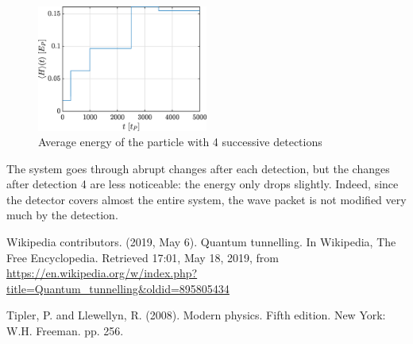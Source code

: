 \documentclass[a4paper,12pt,twoside]{article}
\begin{document}
      \begin{figure}[h!]
      \centering
       \includegraphics[width=0.5\textwidth]{graphs/bonus2_H.eps}
       \caption{Average energy of the particle with 4 successive detections}
       \label{fig:bonus2_H}
      \end{figure}
      
      The system goes through abrupt changes after each detection, but the changes after detection 4 are less noticeable: the energy only drops slightly. Indeed, since the detector covers almost the entire system, the wave packet is not modified very much by the detection.

\newpage
\begin{thebibliography}{99}
   Wikipedia contributors. (2019, May 6). Quantum tunnelling. In Wikipedia, The Free Encyclopedia. Retrieved 17:01, May 18, 2019, from \url{https://en.wikipedia.org/w/index.php?title=Quantum_tunnelling&oldid=895805434}

   Tipler, P. and Llewellyn, R. (2008). Modern physics. Fifth edition. New York: W.H. Freeman. pp. 256.
\end{thebibliography}
\end{document}
